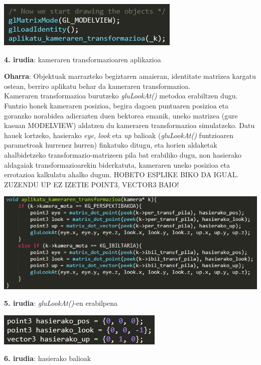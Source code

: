 \documentclass[12pt]{article}
\newcommand{\metodo}[1] {\textit{#1}}
\newcommand{\aldagai}[1] {\textit{#1}}
\begin{document}
\begin{center}
\includegraphics[scale=1]{kamera_transform.png}

\textbf{4. irudia}: kameraren transformazioaren aplikazioa
\end{center}

\textbf{Oharra}: Objektuak marrazteko begiztaren amaieran, identitate matrizea kargatu ostean, berriro aplikatu behar da kameraren transformazioa.\\

Kameraren transformazioa burutzeko \metodo{gluLookAt()}\cite{glu_lookat} metodoa erabiltzen dugu. Funtzio honek kameraren posizioa, begira dagoen puntuaren posizioa eta goranzko norabidea adierazten duen bektorea emanik, uneko matrizea (gure kasuan MODELVIEW) aldatzen du kameraren transformazioa simulatzeko. Datu hauek lortzeko, hasierako \aldagai{eye}, \aldagai{look} eta \aldagai{up} balioak (\metodo{gluLookAt()} funtzioaren parametroak hurrenez hurren) finkatuko ditugu, eta horien aldaketak ahalbidetzeko transformazio-matrizeen pila bat erabiliko dugu, non hasierako aldagaiak transformazioarekin biderkatuta, kameraren uneko posizioa eta errotazioa kalkulatu ahalko dugun. HOBETO ESPLIKE BIKO DA IGUAL. ZUZENDU UP EZ IZETIE POINT3, VECTOR3 BAIO!

\begin{center}
\includegraphics[scale=0.8]{kamera_lookat.png}

\textbf{5. irudia}: \metodo{gluLookAt()}-en erabilpena
\end{center}

\begin{center}
\includegraphics[scale=1]{kamera_hasierako_balioak.png}

\textbf{6. irudia}: hasierako balioak
\end{center}
\end{document}
